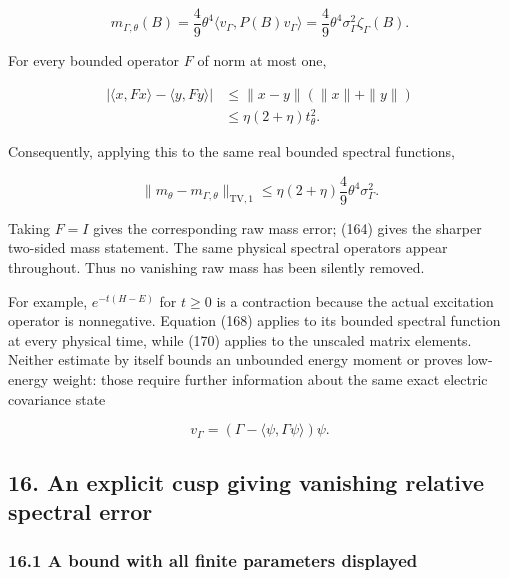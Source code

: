 \documentclass[
  11pt,
]{article}
\begin{document}
\[
 m_{\Gamma,\theta}(B)
 =\frac49\theta^4\langle v_\Gamma,P(B)v_\Gamma\rangle
 =\frac49\theta^4\sigma_\Gamma^2\zeta_\Gamma(B).
\tag{169}
\]

For every bounded operator \(F\) of norm at most one,

\[
 \begin{aligned}
 |\langle x,Fx\rangle-\langle y,Fy\rangle|
 &\le\|x-y\|(\|x\|+\|y\|)\\
 &\le\eta(2+\eta)t_\theta^2.
 \end{aligned}
\]

Consequently, applying this to the same real bounded spectral functions,

\[
 \boxed{\|m_\theta-m_{\Gamma,\theta}\|_{\mathrm{TV},1}
 \le\eta(2+\eta)\frac49\theta^4\sigma_\Gamma^2.}
\tag{170}
\]

Taking \(F=I\) gives the corresponding raw mass error; (164) gives the
sharper two-sided mass statement. The same physical spectral operators
appear throughout. Thus no vanishing raw mass has been silently removed.

For example, \(e^{-t(H-E)}\) for \(t\ge0\) is a contraction because the
actual excitation operator is nonnegative. Equation (168) applies to its
bounded spectral function at every physical time, while (170) applies to
the unscaled matrix elements. Neither estimate by itself bounds an
unbounded energy moment or proves low-energy weight: those require
further information about the same exact electric covariance state

\[
 v_\Gamma=(\Gamma-\langle\psi,\Gamma\psi\rangle)\psi.
\]

\subsection{16. An explicit cusp giving vanishing relative spectral
error}\label{an-explicit-cusp-giving-vanishing-relative-spectral-error}

\subsubsection{16.1 A bound with all finite parameters
displayed}\label{a-bound-with-all-finite-parameters-displayed}
\end{document}
